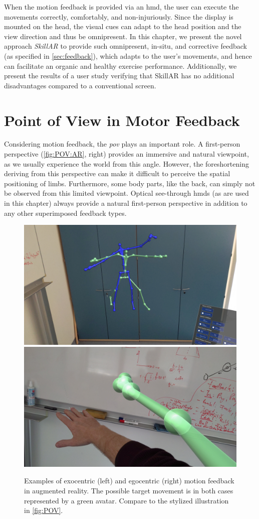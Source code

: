 When the motion feedback is provided via an \acrshort{hmd}, the user can execute the movements correctly, comfortably, and non-injuriously. Since the display is mounted on the head, the visual cues can adapt to the head position and the view direction and thus be omnipresent. In this chapter, we present the novel approach \emph{SkillAR} to provide such omnipresent, in-situ, and corrective feedback (as specified in \autoref{sec:feedback}), which adapts to the user's movements, and hence can facilitate an organic and healthy exercise performance. Additionally, we present the results of a user study verifying that SkillAR has no additional disadvantages compared to a conventional screen.

\section{Point of View in Motor Feedback\label{sec:omnipresent:POV}}
Considering motion feedback, the \emph{\acrshort{pov}} plays an important role. A first-person perspective (\autoref{fig:POV:AR}, right) provides an immersive and natural viewpoint, as we usually experience the world from this angle. However, the foreshortening deriving from this perspective can make it difficult to perceive the spatial positioning of limbs. Furthermore, some body parts, like the back, can simply not be observed from this limited viewpoint. 
Optical see-through \acrshort{hmd}s (as are used in this chapter) always provide a natural first-person perspective in addition to any other superimposed feedback types.

\begin{figure}[h!]
	\centering
	\includegraphics[width=0.49\linewidth]{pictures/ExocentricAR.jpg}\hfill
	\includegraphics[width=0.49\linewidth]{pictures/EgocentricAR.jpg}
	\caption[Examples of exocentric and egocentric motion feedback in \acrshort{ar}.]{Examples of exocentric (left) and egocentric (right) motion feedback in augmented reality. The possible target movement is in both cases represented by a green avatar. Compare to the stylized illustration in \autoref{fig:POV}.}
	\label{fig:POV:AR}
\end{figure}

